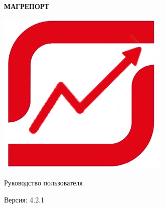 \documentclass[../user-manual.tex]{subfiles}
\begin{document}
	\begin{titlepage}
		
		\begin{center}
			
			\vspace*{5cm}
			
			\Huge
			
			\textbf{МАГРЕПОРТ}
			
			\vspace{2cm}

			\includegraphics[width=\graphicswidth]{img/magreport-logo.png}
			
			\vspace{2cm}
			
			\LARGE
			
			Руководство пользователя
			
			\vfill
			
			\large
			
			Версия: 4.2.1
		
		\end{center}
	\end{titlepage}
	
\end{document}
